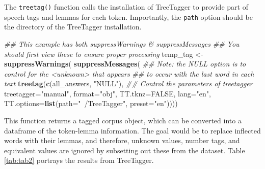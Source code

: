 \documentclass[man]{apa6}
\newenvironment{Shaded}{\begin{snugshade}}{\end{snugshade}}
\newcommand{\CommentTok}[1]{\textcolor[rgb]{0.56,0.35,0.01}{\textit{#1}}}
\newcommand{\DataTypeTok}[1]{\textcolor[rgb]{0.13,0.29,0.53}{#1}}
\newcommand{\KeywordTok}[1]{\textcolor[rgb]{0.13,0.29,0.53}{\textbf{#1}}}
\newcommand{\NormalTok}[1]{#1}
\newcommand{\OtherTok}[1]{\textcolor[rgb]{0.56,0.35,0.01}{#1}}
\newcommand{\StringTok}[1]{\textcolor[rgb]{0.31,0.60,0.02}{#1}}
\begin{document}
\normalsize

The \texttt{treetag()} function calls the installation of TreeTagger to provide part of speech tags and lemmas for each token. Importantly, the \texttt{path} option should be the directory of the TreeTagger installation.

\scriptsize

\begin{Shaded}
\begin{Highlighting}[]
\CommentTok{## This example has both suppressWarnings & suppressMessages}
\CommentTok{## You should first view these to ensure proper processing}
\NormalTok{temp_tag <-}\StringTok{ }\KeywordTok{suppressWarnings}\NormalTok{(}
  \KeywordTok{suppressMessages}\NormalTok{(}
    \CommentTok{## Note: the NULL option is to control for the <unknown> that appears}
    \CommentTok{## to occur with the last word in each text}
    \KeywordTok{treetag}\NormalTok{(}\KeywordTok{c}\NormalTok{(all_answers, }\StringTok{"NULL"}\NormalTok{), }
            \CommentTok{## Control the parameters of treetagger}
            \DataTypeTok{treetagger=}\StringTok{"manual"}\NormalTok{, }\DataTypeTok{format=}\StringTok{"obj"}\NormalTok{,}
            \DataTypeTok{TT.tknz=}\OtherTok{FALSE}\NormalTok{, }\DataTypeTok{lang=}\StringTok{"en"}\NormalTok{,}
            \DataTypeTok{TT.options=}\KeywordTok{list}\NormalTok{(}\DataTypeTok{path=}\StringTok{"~/TreeTagger"}\NormalTok{, }\DataTypeTok{preset=}\StringTok{"en"}\NormalTok{))))}
\end{Highlighting}
\end{Shaded}

\normalsize

This function returns a tagged corpus object, which can be converted into a dataframe of the token-lemma information. The goal would be to replace inflected words with their lemmas, and therefore, unknown values, number tags, and equivalent values are ignored by subsetting out these from the dataset. Table \ref{tab:tab2} portrays the results from TreeTagger.

\scriptsize
\end{document}
